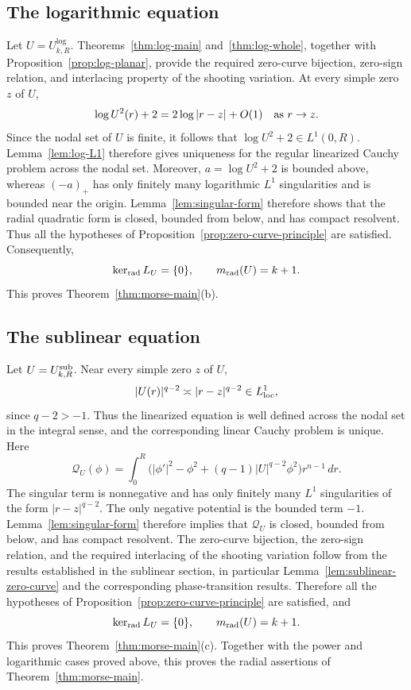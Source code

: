 \documentclass[11pt]{article}
\begin{document}
\subsection{The logarithmic equation}
Let $U=U^{\log}_{k,R}$.  Theorems~\ref{thm:log-main} and~\ref{thm:log-whole},
together with Proposition~\ref{prop:log-planar}, provide the required
zero-curve bijection, zero-sign relation, and interlacing property of the
shooting variation.  At every simple
zero $z$ of $U$,
\[
 \log U^2(r)+2=2\log|r-z|+O(1)\quad\hbox{as }r\to z.
\]
Since the nodal set of $U$ is finite, it follows that
$\log U^2+2\in L^1(0,R)$. Lemma~\ref{lem:log-L1} therefore gives uniqueness for the regular
linearized Cauchy problem across the nodal set.
{Moreover, $a=\log U^2+2$ is bounded above, whereas
$(-a)_+$ has only finitely many logarithmic $L^1$ singularities and
is bounded near the origin. Lemma~\ref{lem:singular-form} therefore
shows that the radial quadratic form is closed, bounded from below,
and has compact resolvent.} Thus all the hypotheses of
Proposition~\ref{prop:zero-curve-principle} are satisfied.
Consequently,
\[
 \ker_{\rm rad}L_U=\{0\},
 \qquad
 m_{\rm rad}(U)=k+1.
\]
This proves Theorem~\ref{thm:morse-main}(b).


\subsection{The sublinear equation}

Let $U=U_{k,R}^{\rm sub}$.  Near every simple zero $z$ of $U$,
\[
 {|U(r)|^{q-2}\asymp |r-z|^{q-2}\in L^1_{\rm loc}},
\]
since $q-2>-1$. Thus the linearized equation is well defined across
the nodal set in the integral sense, and the corresponding linear
Cauchy problem is unique. {Here
\[
 \mathcal Q_U(\phi)=\int_0^R
 \bigl(|\phi'|^2-\phi^2+(q-1)|U|^{q-2}\phi^2\bigr)r^{n-1}\,dr.
\]
The singular term is nonnegative and has only finitely many
$L^1$ singularities of the form $|r-z|^{q-2}$. The only negative
potential is the bounded term $-1$. Lemma~\ref{lem:singular-form}
therefore implies that $\mathcal Q_U$ is closed, bounded from below,
and has compact resolvent.}
The zero-curve bijection, the zero-sign relation, and the required
interlacing of the shooting variation follow from the results
established in the sublinear section, in particular
Lemma~\ref{lem:sublinear-zero-curve} and the corresponding
phase-transition results. Therefore all the hypotheses of
Proposition~\ref{prop:zero-curve-principle} are satisfied, and
\[
 \ker_{\rm rad}L_U=\{0\},\qquad
 m_{\rm rad}(U)=k+1.
\]
This proves Theorem~\ref{thm:morse-main}(c). Together with the power and logarithmic cases proved above, this
proves the radial assertions of Theorem~\ref{thm:morse-main}.
\end{document}
